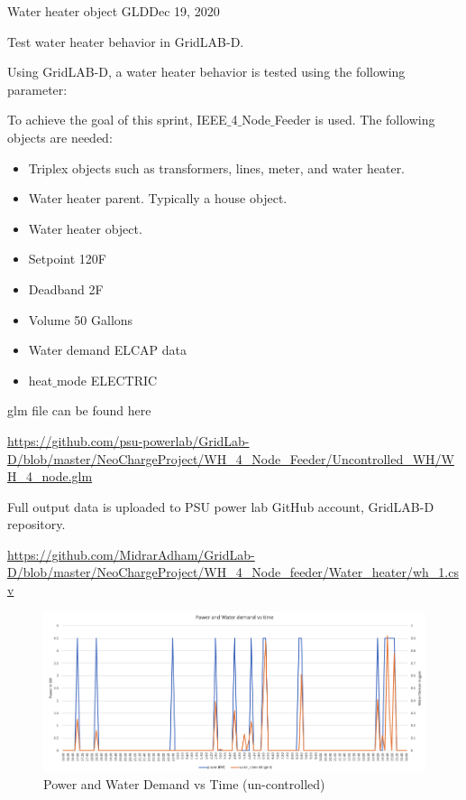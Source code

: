 \begin{entry}{Water heater object GLD}{Dec 19, 2020}
    \objective 
    
    Test water heater behavior in GridLAB-D.
    
    \outline
    
    Using GridLAB-D, a water heater behavior is tested using the following parameter:
    \procedures
    
    To achieve the goal of this sprint, IEEE$\_$4$\_$Node$\_$Feeder is used. The following objects are needed:
    \begin{itemize}
        \item Triplex objects such as transformers, lines, meter, and water heater.
        \item Water heater parent. Typically a house object.
        \item Water heater object.
    \end{itemize}
    
    \parameters
    
    \begin{itemize}
        \item Setpoint 120F
        \item Deadband 2F
        \item Volume 50 Gallons
        \item Water demand ELCAP data
        \item heat$\_$mode ELECTRIC
    \end{itemize}
    
    \data \par 
    glm file can be found here \par  \url{https://github.com/psu-powerlab/GridLab-D/blob/master/NeoChargeProject/WH_4_Node_Feeder/Uncontrolled_WH/WH_4_node.glm}

    \par Full output data is uploaded to PSU power lab GitHub account, GridLAB-D repository.
    
    \url{https://github.com/MidrarAdham/GridLab-D/blob/master/NeoChargeProject/WH_4_Node_feeder/Water_heater/wh_1.csv}
\newpage
    \results
        \begin{figure}[hbt!]
            \includegraphics[scale=0.5]{uncontrolled_wh.png}
            \caption{Power and Water Demand vs Time (un-controlled)}
            \label{fig:uncontrolled_wh}
        \end{figure}
    
\end{entry}

\newpage
